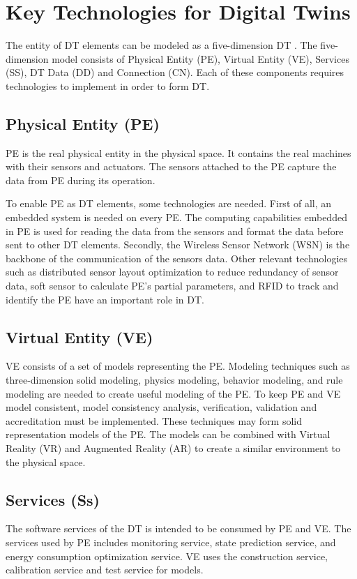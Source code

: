 \documentclass[article]{aaltoseries}
\begin{document}

\section{Key Technologies for Digital Twins}
The entity of DT elements can be modeled as a five-dimension DT \cite{Tao2019}. The five-dimension model consists of Physical Entity (PE), Virtual Entity (VE), Services (SS), DT Data (DD) and Connection (CN). Each of these components requires technologies to implement in order to form DT.

\subsection{Physical Entity (PE)}
PE is the real physical entity in the physical space. It contains the real machines with their sensors and actuators. The sensors attached to the PE capture the data from PE during its operation.

To enable PE as DT elements, some technologies are needed. First of all, an embedded system is needed on every PE. The computing capabilities embedded in PE is used for reading the data from the sensors and format the data before sent to other DT elements. Secondly, the Wireless Sensor Network (WSN) is the backbone of the communication of the sensors data. Other relevant technologies such as distributed sensor layout optimization to reduce redundancy of sensor data, soft sensor to calculate PE's partial parameters, and RFID to track and identify the PE have an important role in DT.

\subsection{Virtual Entity (VE)}
VE consists of a set of models representing the PE. Modeling techniques such as three-dimension solid modeling, physics modeling, behavior modeling, and rule modeling are needed to create useful modeling of the PE. To keep PE and VE model consistent, model consistency analysis, verification, validation and accreditation must be implemented. These techniques may form solid representation models of the PE. The models can be combined with Virtual Reality (VR) and Augmented Reality (AR) to create a similar environment to the physical space.

\subsection{Services (Ss)}
The software services of the DT is intended to be consumed by PE and VE. The services used by PE includes monitoring service, state prediction service, and energy consumption optimization service. VE uses the construction service, calibration service and test service for models.
\end{document}
